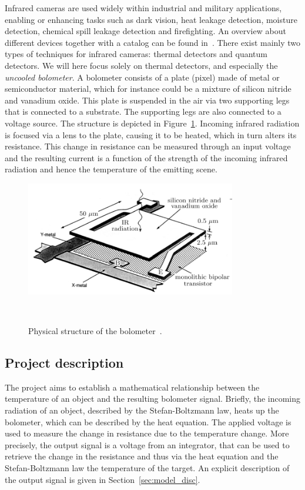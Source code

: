 Infrared cameras are used widely within industrial and military
applications, enabling or enhancing tasks such as dark vision, heat
leakage detection, moisture detection, chemical spill leakage
detection and firefighting. An overview about different devices
together with a catalog can be found in~\cite{flir_handbook}. There
exist mainly two types of techniques for infrared cameras: thermal
detectors and quantum detectors. We will here focus solely on thermal
detectors, and especially the \textit{uncooled bolometer}. A bolometer consists of a plate (pixel)
made of metal or semiconductor material, which for instance could be a mixture of
silicon nitride and vanadium oxide. This plate is suspended in the air
via two supporting legs that is connected to a substrate. The
supporting legs are also connected to a voltage
source. The structure is depicted in Figure~\ref{fig:structure}. Incoming infrared radiation is focused via a lens to the
plate, causing it to be heated, which in turn alters its
resistance. This change in resistance can be measured through an
input voltage and the resulting current is a function of the strength
of the incoming infrared radiation and hence
the temperature of the emitting scene.

\begin{figure}[h]
\begin{center}
\includegraphics[height=5cm]{gfx/pixel1.png}
\caption{Physical structure of the bolometer~\cite{xiu2010research}.}~\label{fig:structure}
\end{center}
\end{figure}

\subsection{Project description}

The project aims to establish a mathematical relationship between the
temperature of an object and the resulting bolometer signal. Briefly,
the incoming radiation of an object, described by the Stefan-Boltzmann
law, heats up the bolometer, which can be described by the heat
equation. The applied voltage is used to measure the change in
resistance due to the temperature change. More precisely, the
output signal is a voltage from an integrator, that can be used to
retrieve the change in the resistance and thus via the heat equation
and the Stefan-Boltzmann law the temperature of the target. An explicit
description of the output signal is given in
Section~\ref{sec:model_disc}.

